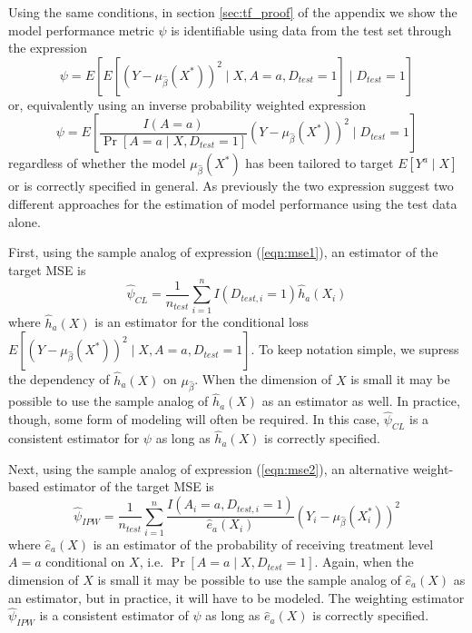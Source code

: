 Using the same conditions, in section \ref{sec:tf_proof} of the appendix we show the model performance metric $\psi$ is identifiable using data from the test set through the expression
\begin{equation}\label{eqn:mse1}
    \psi = E\left[E[(Y - \mu_{\widehat{\beta}}(X^*))^2 \mid X, A=a, D_{test} = 1] \mid D_{test} = 1\right]
\end{equation}
or, equivalently using an inverse probability weighted expression 
\begin{equation}\label{eqn:mse2}
    \psi = E\left[\frac{I(A = a)}{\Pr[A = a \mid X, D_{test} = 1]}(Y - \mu_{\widehat{\beta}}(X^*))^2 \mid D_{test} = 1\right]
\end{equation}
regardless of whether the model $\mu_{\widehat{\beta}}(X^*)$ has been tailored to target $E[Y^a \mid X]$ or is correctly specified in general. 
As previously the two expression suggest two different approaches for the estimation of model performance using the test data alone. 

First, using the sample analog of expression (\ref{eqn:mse1}), an estimator of the target MSE is 
\begin{equation}\label{eqn:cl_estimator}
    \widehat{\psi}_{CL} = \frac{1}{n_{test}} \sum_{i=1}^nI(D_{test, i} = 1)\widehat{h}_a(X_i)
\end{equation}
where $\widehat{h}_a(X)$ is an estimator for the conditional loss $E[(Y - \mu_{\widehat{\beta}}(X^*))^2 \mid X, A=a, D_{test} = 1]$. To keep notation simple, we supress the dependency of $\widehat{h}_a(X)$ on $\mu_{\widehat{\beta}}$. When the dimension of $X$ is small it may be possible to use the sample analog of $\widehat{h}_a(X)$ as an estimator as well. In practice, though, some form of modeling will often be required. In this case, $\widehat{\psi}_{CL}$ is a consistent estimator for $\psi$ as long as $\widehat{h}_a(X)$ is correctly specified.

Next, using the sample analog of expression (\ref{eqn:mse2}), an alternative weight-based estimator of the target MSE is 
\begin{equation}\label{eqn:ipw_estimator}
    \widehat{\psi}_{IPW} = \frac{1}{n_{test}} \sum_{i=1}^n \frac{I(A_i = a, D_{test, i} = 1)}{\widehat{e}_a(X_i)}(Y_i - \mu_{\widehat{\beta}}(X^*_i))^2
\end{equation}
where $\widehat{e}_a(X)$ is an estimator of the probability of receiving treatment level $A = a$ conditional on $X$, i.e. $\Pr[A = a \mid X, D_{test} = 1]$. Again, when the dimension of $X$ is small it may be possible to use the sample analog of $\widehat{e}_a(X)$ as an estimator, but in practice, it will have to be modeled. The weighting estimator $\widehat{\psi}_{IPW}$ is a consistent estimator of $\psi$ as long as $\widehat{e}_a(X)$ is correctly specified.

